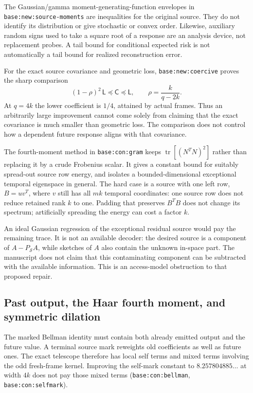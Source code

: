 \documentclass[11pt,oneside,openany,a4paper]{report}
\numberwithin{equation}{chapter}
\theoremstyle{definition}
\theoremstyle{remark}
\begin{document}
The Gaussian/gamma moment-generating-function envelopes in
\texttt{base:new:source-moments} are inequalities for the original
source.  They do not identify its distribution or give stochastic or
convex order.  Likewise, auxiliary random signs used to take a square
root of a response are an analysis device, not replacement probes.
A tail bound for conditional expected risk is not automatically a
tail bound for realized reconstruction error.

For the exact source covariance and geometric loss,
\texttt{base:new:coercive} proves the sharp comparison
\[
 (1-\rho)^2\,\mathsf L\preceq\mathsf C\preceq\mathsf L,
 \qquad \rho=\frac{k}{q-2k}.
\]
At $q=4k$ the lower coefficient is $1/4$, attained by actual frames.
Thus an arbitrarily large improvement cannot come solely from
claiming that the exact covariance is much smaller than geometric
loss.  The comparison does not control how a dependent future
response aligns with that covariance.

The fourth-moment method in \texttt{base:con:gram} keeps
$\operatorname{tr}[(N^TN)^2]$ rather than replacing it by a crude
Frobenius scalar.  It gives a constant bound for suitably spread-out
source row energy, and isolates a bounded-dimensional exceptional
temporal eigenspace in general.  The hard case is a source with one
left row, $B=uv^T$, where $v$ still has all $mk$ temporal coordinates:
one source row does not reduce retained rank $k$ to one.  Padding that
preserves $B^TB$ does not change its spectrum; artificially spreading
the energy can cost a factor $k$.

An ideal Gaussian regression of the exceptional residual source
would pay the remaining trace.  It is not an available decoder:
the desired source is a component of $A-P_{\mathcal S}A$, while
sketches of $A$ also contain the unknown in-space part.  The
manuscript does not claim that this contaminating component can be
subtracted with the available information.  This is an access-model
obstruction to that proposed repair.

\subsection{Past output, the Haar fourth moment, and symmetric dilation}

The marked Bellman identity must contain both already emitted output
and the future value.  A terminal source mark reweights old
coefficients as well as future ones.  The exact telescope therefore
has local self terms and mixed terms involving the odd fresh-frame
kernel.  Improving the self-mark constant to
$8.257804885\ldots$ at width $4k$ does not pay those mixed terms
(\texttt{base:con:bellman}, \texttt{base:con:selfmark}).
\end{document}
